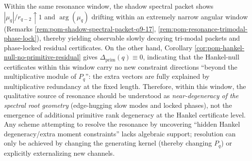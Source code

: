 \begin{remark}\label{rem:pom-resonance-spectral-not-hankel-degeneracy}
Within the same resonance window, the shadow spectral packet shows \(|\mu_q|/r_{q-2}\uparrow 1\) and \(\arg(\mu_q)\) drifting within an extremely narrow angular window (Remarks \ref{rem:pom-shadow-spectral-packet-q9-17}, \ref{rem:pom-resonance-trimodal-phase-lock}), thereby yielding observable slowly decaying tri-modal packets and phase-locked residual certificates.
On the other hand, Corollary \ref{cor:pom-hankel-null-no-primitive-residual} gives \(\Delta_{\mathrm{prim}}(q)\equiv 0\), indicating that the Hankel-null certificates within this window carry no new constraint directions ``beyond the multiplicative module of \(P_q\)'': the extra vectors are fully explained by multiplicative redundancy at the fixed length.
Therefore, within this window, the qualitative source of resonance should be understood as \emph{near-degeneracy of the spectral root geometry} (edge-hugging slow modes and locked phases), not the emergence of additional primitive rank degeneracy at the Hankel certificate level.
Any scheme attempting to resolve the resonance by uncovering ``hidden Hankel degeneracy/extra moment constraints'' lacks algebraic support; resolution can only be achieved by changing the generating kernel (thereby changing \(P_q\)) or explicitly externalizing new channels.
\end{remark}

